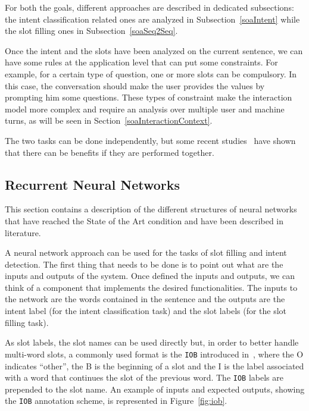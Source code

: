 For both the goals, different approaches are described in dedicated subsections: the intent classification related ones are analyzed in Subsection~\ref{soaIntent} while the slot filling ones in Subsection~\ref{soaSeq2Seq}.

Once the intent and the slots have been analyzed on the current sentence, we can have some rules at the application level that can put some constraints. For example, for a certain type of question, one or more slots can be compulsory. In this case, the conversation should make the user provides the values by prompting him some questions. These types of constraint make the interaction model more complex and require an analysis over multiple user and machine turns, as will be seen in Section~\ref{soaInteractionContext}.

The two tasks can be done independently, but some recent studies~\cite{guo2014joint,liu2016attention} have shown that there can be benefits if they are performed together.

\subsection{Recurrent Neural Networks}
This section contains a description of the different structures of neural networks that have reached the State of the Art condition and have been described in literature.

A neural network approach can be used for the tasks of slot filling and intent detection. The first thing that needs to be done is to point out what are the inputs and outputs of the system. Once defined the inputs and outputs, we can think of a component that implements the desired functionalities. The inputs to the network are the words contained in the sentence and the outputs are the intent label (for the intent classification task) and the slot labels (for the slot filling task).

As slot labels, the slot names can be used directly but, in order to better handle multi-word slots, a commonly used format is the \texttt{IOB} introduced in~\cite{ramshaw1999text}, where the O indicates ``other'', the B is the beginning of a slot and the I is the label associated with a word that continues the slot of the previous word. The \texttt{IOB} labels are prepended to the slot name.
An example of inputs and expected outputs, showing the \texttt{IOB} annotation scheme, is represented in Figure~\ref{fig:iob}.


